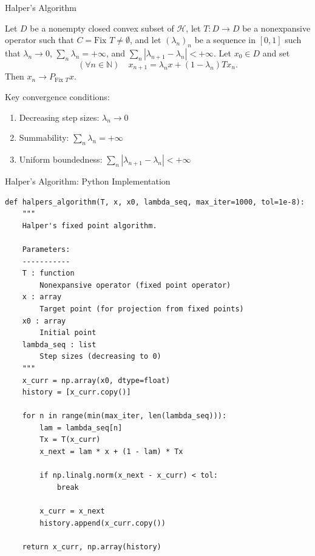 \documentclass[aspectratio=169,10pt]{beamer}
\begin{document}
\begin{frame}{Halper's Algorithm}
  \begin{theorem}
    Let $D$ be a nonempty closed convex subset of $\mathcal{H}$, let $T: D \to D$ be a nonexpansive operator such that $C = \text{Fix } T \neq \emptyset$, and let $(\lambda_n)_n$ be a sequence in $[0,1]$ such that $\lambda_n \to 0$, $\sum_n \lambda_n = +\infty$, and $\sum_n |\lambda_{n+1} - \lambda_n| < +\infty$. Let $x_0 \in D$ and set
    \[
      (\forall n \in \mathbb{N}) \quad x_{n+1} = \lambda_n x + (1 - \lambda_n) T x_n.
    \]
    Then $x_n \to P_{\text{Fix } T} x$.
  \end{theorem}

  \vspace{0.3cm}

  Key convergence conditions:
  \begin{enumerate}
    \item Decreasing step sizes: $\lambda_n \to 0$
    \item Summability: $\sum_n \lambda_n = +\infty$
    \item Uniform boundedness: $\sum_n |\lambda_{n+1} - \lambda_n| < +\infty$
  \end{enumerate}
\end{frame}


\begin{frame}[fragile]{Halper's Algorithm: Python Implementation}
  \begin{lstlisting}
def halpers_algorithm(T, x, x0, lambda_seq, max_iter=1000, tol=1e-8):
    """
    Halper's fixed point algorithm.

    Parameters:
    -----------
    T : function
        Nonexpansive operator (fixed point operator)
    x : array
        Target point (for projection from fixed points)
    x0 : array
        Initial point
    lambda_seq : list
        Step sizes (decreasing to 0)
    """
    x_curr = np.array(x0, dtype=float)
    history = [x_curr.copy()]

    for n in range(min(max_iter, len(lambda_seq))):
        lam = lambda_seq[n]
        Tx = T(x_curr)
        x_next = lam * x + (1 - lam) * Tx

        if np.linalg.norm(x_next - x_curr) < tol:
            break

        x_curr = x_next
        history.append(x_curr.copy())

    return x_curr, np.array(history)
  \end{lstlisting}
\end{frame}
\end{document}
